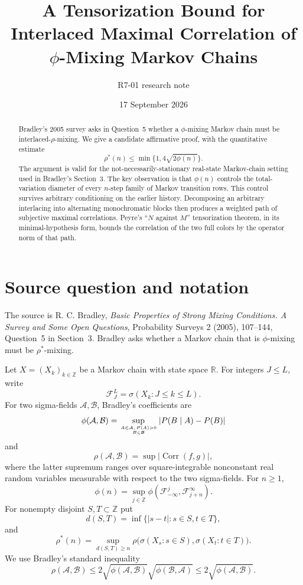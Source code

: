 \documentclass[11pt]{article}
\title{A Tensorization Bound for Interlaced Maximal Correlation of $\phi$-Mixing Markov Chains}
\author{R7-01 research note}
\date{17 September 2026}
\newcommand{\cF}{\mathcal F}
\begin{document}
\maketitle

\begin{abstract}
Bradley's 2005 survey asks in Question~5 whether a $\phi$-mixing Markov chain must be interlaced-$\rho$-mixing.  We give a candidate affirmative proof, with the quantitative estimate
\[
   \rho^{*}(n)\le \min\{1,4\sqrt{2\phi(n)}\}.
\]
The argument is valid for the not-necessarily-stationary real-state Markov-chain setting used in Bradley's Section~3.  The key observation is that $\phi(n)$ controls the total-variation diameter of every $n$-step family of Markov transition rows.  This control survives arbitrary conditioning on the earlier history.  Decomposing an arbitrary interlacing into alternating monochromatic blocks then produces a weighted path of subjective maximal correlations.  Peyre's ``$N$ against $M$'' tensorization theorem, in its minimal-hypothesis form, bounds the correlation of the two full colors by the operator norm of that path.
\end{abstract}

\section{Source question and notation}

The source is R. C. Bradley, \emph{Basic Properties of Strong Mixing Conditions. A Survey and Some Open Questions}, Probability Surveys 2 (2005), 107--144, Question~5 in Section~3.  Bradley asks whether a Markov chain that is $\phi$-mixing must be $\rho^{*}$-mixing.

Let $X=(X_k)_{k\in\mathbb Z}$ be a Markov chain with state space $\mathbb R$.  For integers $J\le L$, write
\[
  \cF_J^L=\sigma(X_k:J\le k\le L).
\]
For two sigma-fields $\mathcal A,\mathcal B$, Bradley's coefficients are
\[
 \phi(\mathcal A,\mathcal B)
 =\sup_{A\in\mathcal A,\,P(A)>0\atop B\in\mathcal B}
     |P(B\mid A)-P(B)|
\]
and
\[
 \rho(\mathcal A,\mathcal B)
 =\sup |\operatorname{Corr}(f,g)|,
\]
where the latter supremum ranges over square-integrable nonconstant real random variables measurable with respect to the two sigma-fields.  For $n\ge1$,
\[
  \phi(n)=\sup_{j\in\mathbb Z}
  \phi(\cF_{-\infty}^{j},\cF_{j+n}^{\infty}).
\]
For nonempty disjoint $S,T\subset\mathbb Z$ put
\[
 d(S,T)=\inf\{|s-t|:s\in S,t\in T\},
\]
and
\[
 \rho^{*}(n)=\sup_{d(S,T)\ge n}
  \rho\bigl(\sigma(X_s:s\in S),\sigma(X_t:t\in T)\bigr).
\]
We use Bradley's standard inequality
\begin{equation}\label{eq:bradley-rho-phi}
 \rho(\mathcal A,\mathcal B)
 \le 2\sqrt{\phi(\mathcal A,\mathcal B)}
       \sqrt{\phi(\mathcal B,\mathcal A)}
 \le 2\sqrt{\phi(\mathcal A,\mathcal B)}.
\end{equation}
\end{document}
